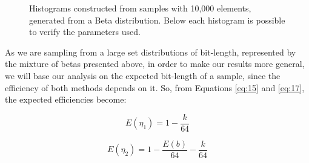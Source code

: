 \documentclass[10pt]{article}
\begin{document}
\begin{figure}[ht]
{  }
  \caption{Histograms constructed from samples with 10,000 elements, generated from a Beta distribution. Below each histogram is possible to verify the parameters used.}
  \label{fig:01020304}
\end{figure}

As we are sampling from a large set distributions of bit-length, represented by the mixture of betas presented above, in order to make our results more general, we will base our analysis on the expected bit-length of a sample, since the efficiency of both methods depends on it. So, from Equations \ref{eq:15} and \ref{eq:17}, the expected efficiencies become: 
 
\begin{equation}\label{eq:20}
 E(\eta_1) = 1 - \frac{k}{64}
\end{equation}

\begin{equation}\label{eq:21}
 E(\eta_2) = 1 - \frac{E(b)}{64} - \frac{k}{64}
\end{equation}
\end{document}
